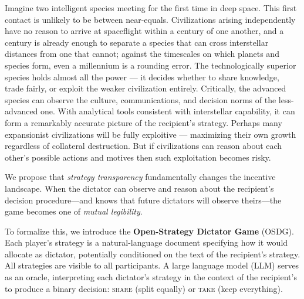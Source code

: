 \documentclass[11pt]{article}
\begin{document}
Imagine two intelligent species meeting for the first time in deep space.
This first contact is unlikely to be between near-equals.
Civilizations arising independently have no reason to arrive at
spaceflight within a century of one another, and a century is
already enough to separate a species that can cross interstellar
distances from one that cannot; against the timescales on which
planets and species form, even a millennium is a rounding error.
The technologically superior species holds almost all the power --- it decides whether to share knowledge, trade fairly, or exploit the weaker civilization entirely.
Critically, the advanced species can observe the culture, communications, and decision norms of the less-advanced one.
With analytical tools consistent with interstellar capability, it can form a remarkably accurate picture of the recipient's strategy.
Perhaps many expansionist civilizations will be fully exploitive --- maximizing their own growth regardless of collateral destruction.
But if civilizations can reason about each other's possible actions and motives then such exploitation becomes risky.

We propose that \emph{strategy transparency} fundamentally changes the
incentive landscape.  When the dictator can observe and reason about
the recipient's decision procedure---and knows that future dictators
will observe theirs---the game becomes one of \emph{mutual legibility}.

To formalize this, we introduce the \textbf{Open-Strategy Dictator Game}
(OSDG).  Each player's strategy is a natural-language document specifying
how it would allocate as dictator, potentially conditioned on the text of
the recipient's strategy.  All strategies are visible to all participants.
A large language model (LLM) serves as an oracle, interpreting
each dictator's strategy in the context of the recipient's to produce a
binary decision: \textup{\textsc{share}} (split equally) or
\textup{\textsc{take}} (keep everything).
\end{document}
